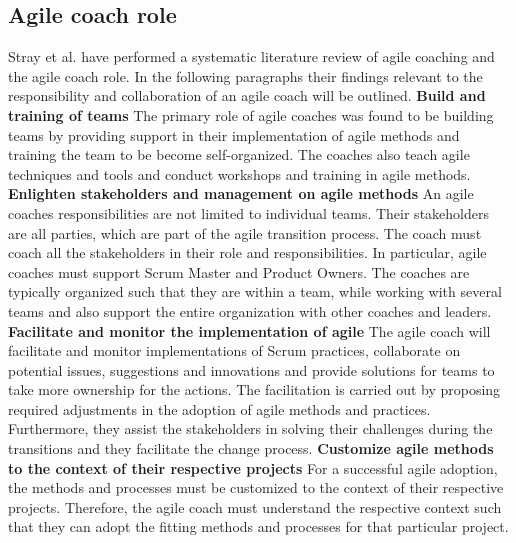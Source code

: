 \documentclass[11pt,a4paper]{report}
\begin{document}
\subsection{Agile coach role}
Stray et al. \cite{litReviewACRole} have performed a systematic literature review of agile coaching and the agile coach role. In the following paragraphs their findings relevant to the responsibility and collaboration of an agile coach will be outlined.
\newline
\newline
\noindent\textbf{Build and training of teams} \newline
The primary role of agile coaches was found to be building teams by providing support in their implementation of agile methods and training the team to be become self-organized. The coaches also teach agile techniques and tools and conduct workshops and training in agile methods.
\newline
\newline
\noindent\textbf{Enlighten stakeholders and management on agile methods}\newline
An agile coaches responsibilities are not limited to individual teams. Their stakeholders are all parties, which are part of the agile transition process. The coach must coach all the stakeholders in their role and responsibilities. In particular, agile coaches must support Scrum Master and Product Owners. The coaches are typically organized such that they are within a team, while working with several teams and also support the entire organization with other coaches and leaders. 
\newline
\newline
\noindent\textbf{Facilitate and monitor the implementation of agile}\newline
The agile coach will facilitate and monitor implementations of Scrum practices, collaborate on potential issues, suggestions and innovations and provide solutions for teams to take more ownership for the actions. The facilitation is carried out by proposing required adjustments in the adoption of agile methods and practices. Furthermore, they assist the stakeholders in solving their challenges during the transitions and they facilitate the change process.
\newline
\newline
\noindent\textbf{Customize agile methods to the context of their respective projects}\newline
For a successful agile adoption, the methods and processes must be customized to the context of their respective projects. Therefore, the agile coach must understand the respective context such that they can adopt the fitting methods and processes for that particular project.
\end{document}
